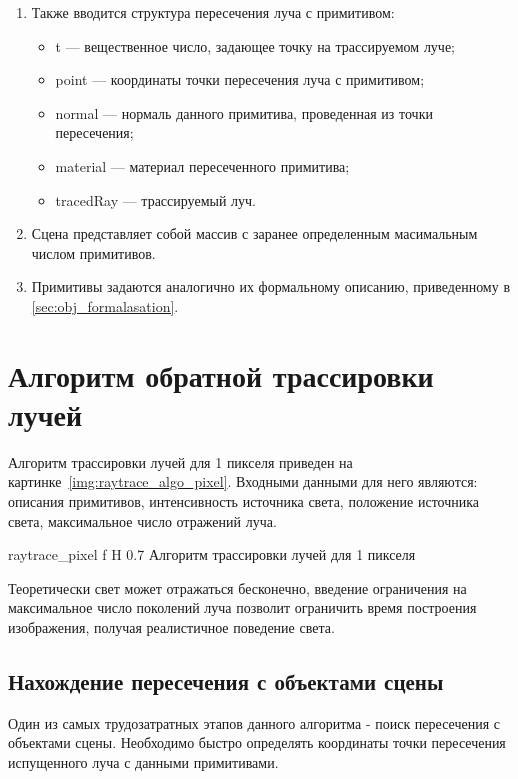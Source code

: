 \begin{enumerate}
	\item  Также вводится структура пересечения луча с примитивом:
	\begin{itemize}
		\item t --- вещественное число, задающее точку на трассируемом луче;
		\item point --- координаты точки пересечения луча с примитивом;
		\item normal --- нормаль данного примитива, проведенная из точки пересечения;
		\item material --- материал пересеченного примитива;
		\item tracedRay --- трассируемый луч.
	\end{itemize}

	\item Сцена представляет собой массив с заранее определенным масимальным числом примитивов.
	\item Примитивы задаются аналогично их формальному описанию, приведенному в \ref{sec:obj_formalasation}.
\end{enumerate}



\section{Алгоритм обратной трассировки лучей}
Алгоритм трассировки лучей для 1 пикселя приведен на картинке~\ref{img:raytrace_algo_pixel}. Входными данными для него являются: описания примитивов,
интенсивность источника света, положение источника света, максимальное число отражений луча.


{raytrace_pixel} %
{f} %
{H} %
{0.7\textwidth} %
{Алгоритм трассировки лучей для 1 пикселя} %

Теоретически свет может отражаться бесконечно, введение ограничения на максимальное число поколений луча позволит ограничить время построения изображения, получая 
реалистичное поведение света.







\subsection{Нахождение пересечения с объектами сцены}
Один из самых трудозатратных этапов данного алгоритма  - поиск пересечения с объектами сцены. Необходимо быстро определять координаты точки пересечения испущенного луча 
с данными примитивами.


